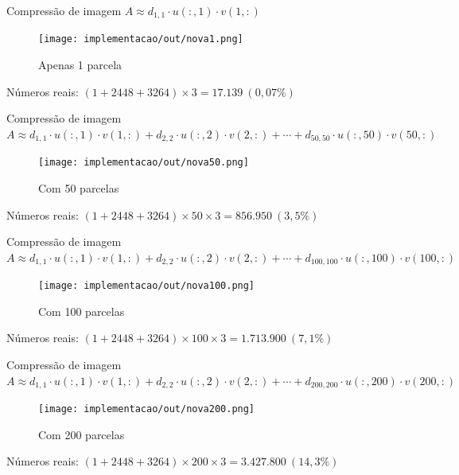 \documentclass{beamer}
\begin{document}
\begin{frame}{Compress\~ao de imagem}{
    $A \approx d_{1,1}\cdot u(:,1)\cdot v(1,:)$}
    \pause
    \begin{figure}
        \centering
        \texttt{[image: implementacao/out/nova1.png]}
        \caption{Apenas 1 parcela}
    \end{figure}
    \begin{center}
        N\'umeros reais: $(1 + 2448 + 3264) \times 3 = 17.139\ (0,07\%)$
    \end{center}
\end{frame}

\begin{frame}{Compress\~ao de imagem}{
    $A \approx d_{1,1}\cdot u(:,1)\cdot v(1,:) + d_{2,2}\cdot
    u(:,2)\cdot v(2,:) +\cdots+ d_{50,50}\cdot u(:,50)\cdot v(50,:)$}
    \begin{figure}
        \centering
        \texttt{[image: implementacao/out/nova50.png]}
        \caption{Com 50 parcelas}
    \end{figure}
    \begin{center}
        N\'umeros reais: $(1 + 2448 + 3264)\times 50 \times 3 = 856.950\ (3,5\%)$
    \end{center}
\end{frame}

\begin{frame}{Compress\~ao de imagem}{
    $A \approx d_{1,1}\cdot u(:,1)\cdot v(1,:) + d_{2,2}\cdot
    u(:,2)\cdot v(2,:) +\cdots+ d_{100,100}\cdot u(:,100)\cdot v(100,:)$}
    \begin{figure}
        \centering
        \texttt{[image: implementacao/out/nova100.png]}
        \caption{Com 100 parcelas}
    \end{figure}
    \begin{center}
        N\'umeros reais: $(1 + 2448 + 3264)\times 100 \times 3 = 1.713.900\ (7,1\%)$
    \end{center}
\end{frame}

\begin{frame}{Compress\~ao de imagem}{
    $A \approx d_{1,1}\cdot u(:,1)\cdot v(1,:) + d_{2,2}\cdot
    u(:,2)\cdot v(2,:) +\cdots+ d_{200,200}\cdot u(:,200)\cdot v(200,:)$}
    \begin{figure}
        \centering
        \texttt{[image: implementacao/out/nova200.png]}
        \caption{Com 200 parcelas}
    \end{figure}
    \begin{center}
        N\'umeros reais: $(1 + 2448 + 3264)\times 200 \times 3 = 3.427.800\ (14,3\%)$
    \end{center}
\end{frame}
\end{document}
